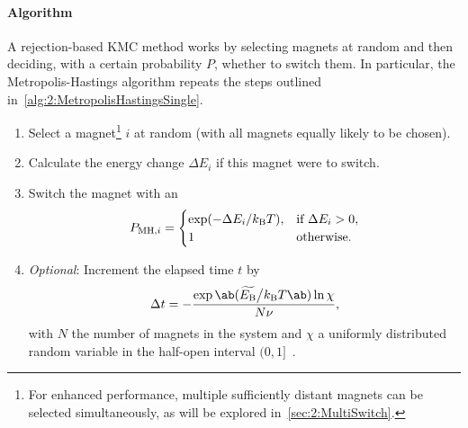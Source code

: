 \paragraph{Algorithm}
A rejection-based KMC method works by selecting magnets at random and then deciding, with a certain probability $P$, whether to switch them.
In particular, the Metropolis-Hastings algorithm repeats the steps outlined in~\cref{alg:2:MetropolisHastingsSingle}.
\vspace{-1em}
\begin{algorithm}
	\label{alg:2:MetropolisHastingsSingle}
	\begin{enumerate}
		\item Select a magnet\footnote{
			For enhanced performance, multiple sufficiently distant magnets can be selected simultaneously, as will be explored in~\cref{sec:2:MultiSwitch}.
		} $i$ at random (with all magnets equally likely to be chosen).
		\item Calculate the energy change $\Delta E_i$ if this magnet were to switch.
		\item Switch the magnet with an 
		\begin{equation}
			\label{eq:2:MH_acceptance}
			P_{\mathrm{MH},i} = \begin{cases}
				\exp(-\Delta E_i/\kBT), & \text{if } \Delta E_i > 0 \mathrm{,} \\
				1 & \text{otherwise} \mathrm{.}
			\end{cases}
		\end{equation}
		\item \textit{Optional}:
		Increment the elapsed time $t$ by
		\begin{equation}
			\label{eq:Metropolis_time}
			\Delta t = -\frac{\exp\ab(\EBeff\big/\kBT\ab) \ln{\chi}}{N \nu} \mathrm{,}
		\end{equation}
		with $N$ the number of magnets in the system and $\chi$ a uniformly distributed random variable in the half-open interval $(0,1]$~\cite{PhysicalTimeKMC}. %
	\end{enumerate}
\end{algorithm}

